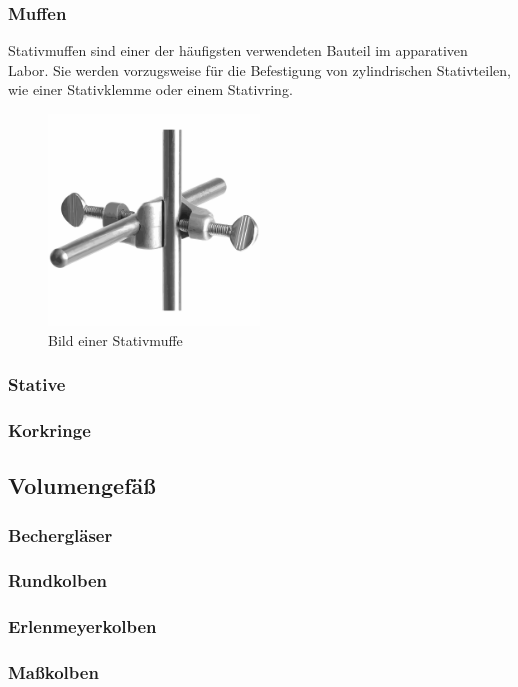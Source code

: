 \subsubsection{Muffen}
Stativmuffen sind einer der häufigsten verwendeten Bauteil im apparativen Labor. Sie werden vorzugsweise für die Befestigung von zylindrischen Stativteilen, wie einer Stativklemme oder einem Stativring.
\begin{figure}[h!]
	\centering
	\includegraphics[width=0.5\textwidth]{img/muffe}
	\caption{Bild einer Stativmuffe}
	\label{fig:muffe}
\end{figure}
\FloatBarrier

\subsubsection{Stative}
\subsubsection{Korkringe}

\subsection{Volumengefäß}
\subsubsection{Bechergläser}
\subsubsection{Rundkolben}
\subsubsection{Erlenmeyerkolben}
\subsubsection{Maßkolben}
